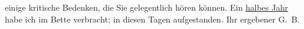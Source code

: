 \begin{ledgroupsized}[t]{13cm}
                    einige kritische Bedenken, die Sie gelegentlich hören können. Ein \uline{halbes Jahr} habe ich im Bette verbracht; in diesen
                    Tagen aufgestanden. Ihr ergebener \spacefill\mbox{G. B.}\pend
           \endnumbering{}\end{ledgroupsized}  \newcommand{\dateiname}{L00924}\newcommand{\titel}{Georg Brandes an Arthur Schnitzler, 12. 6. 1899}\newcommand{\editorInnen}{Martin Anton Müller und Gerd-Hermann Susen}
      